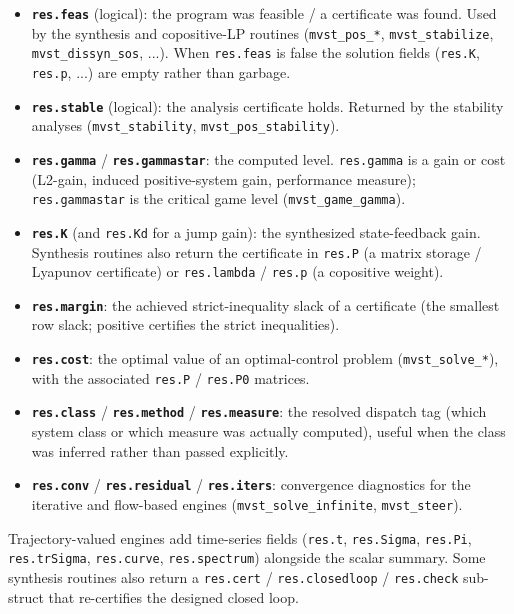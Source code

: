 \documentclass[11pt,oneside]{report}
\newcommand{\code}[1]{\texttt{#1}}
\providecommand{\tightlist}{\setlength{\itemsep}{0pt}\setlength{\parskip}{0pt}}
\begin{document}
\begin{itemize}
\tightlist
\item
  \textbf{\code{res.feas}} (logical): the program was feasible / a certificate was found.
  Used by the synthesis and copositive-LP routines (\code{mvst\_pos\_*},
  \code{mvst\_stabilize}, \code{mvst\_dissyn\_sos}, ...). When \code{res.feas} is false the
  solution fields (\code{res.K}, \code{res.p}, ...) are empty rather than garbage.
\item
  \textbf{\code{res.stable}} (logical): the analysis certificate holds. Returned by the
  stability analyses (\code{mvst\_stability}, \code{mvst\_pos\_stability}).
\item
  \textbf{\code{res.gamma}} / \textbf{\code{res.gammastar}}: the computed level. \code{res.gamma} is a
  gain or cost (L2-gain, induced positive-system gain, performance measure);
  \code{res.gammastar} is the critical game level (\code{mvst\_game\_gamma}).
\item
  \textbf{\code{res.K}} (and \code{res.Kd} for a jump gain): the synthesized state-feedback
  gain. Synthesis routines also return the certificate in \code{res.P} (a matrix
  storage / Lyapunov certificate) or \code{res.lambda} / \code{res.p} (a copositive
  weight).
\item
  \textbf{\code{res.margin}}: the achieved strict-inequality slack of a certificate (the
  smallest row slack; positive certifies the strict inequalities).
\item
  \textbf{\code{res.cost}}: the optimal value of an optimal-control problem
  (\code{mvst\_solve\_*}), with the associated \code{res.P} / \code{res.P0} matrices.
\item
  \textbf{\code{res.class}} / \textbf{\code{res.method}} / \textbf{\code{res.measure}}: the resolved dispatch
  tag (which system class or which measure was actually computed), useful when
  the class was inferred rather than passed explicitly.
\item
  \textbf{\code{res.conv}} / \textbf{\code{res.residual}} / \textbf{\code{res.iters}}: convergence
  diagnostics for the iterative and flow-based engines (\code{mvst\_solve\_infinite},
  \code{mvst\_steer}).
\end{itemize}

Trajectory-valued engines add time-series fields (\code{res.t}, \code{res.Sigma},
\code{res.Pi}, \code{res.trSigma}, \code{res.curve}, \code{res.spectrum}) alongside the scalar
summary. Some synthesis routines also return a \code{res.cert} / \code{res.closedloop} /
\code{res.check} sub-struct that re-certifies the designed closed loop.
\end{document}
